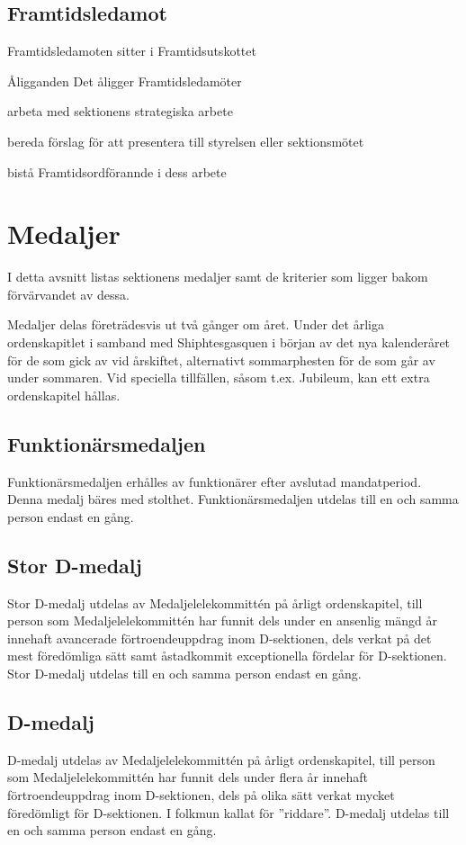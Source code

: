 \documentclass[pdfbookmarks,a4paper,11pt]{article}
\newcommand{\funktionar}[1]{%
  \subsection*{#1}\par
  \addcontentsline{toc}{subsection}{#1}}
\newlength{\itemcollength}
\newenvironment{reglemlista}{%
  \begin{list}{}{%
      \setlength{\labelwidth}{\itemcollength}%
      \setlength{\leftmargin}{\labelwidth + \labelsep}%
      \renewcommand{\makelabel}[1]{%
        \raisebox{0pt}[1ex][0pt]{%
          \makebox[\labelwidth][l]{%
            \parbox[t]{\itemcollength}{%
              \raggedright\hspace{0pt}##1}}}\hfill}%
      }}{%
  \end{list}}
\begin{document}
\funktionar{Framtidsledamot}
Framtidsledamoten sitter i Framtidsutskottet
\begin{reglemlista}
	\item[Åligganden]
	Det åligger Framtidsledamöter
	\begin{attlista}
		\item arbeta med sektionens strategiska arbete
		\item bereda förslag för att presentera till styrelsen eller sektionsmötet
		\item bistå Framtidsordförannde i dess arbete
	\end{attlista}

\end{reglemlista}

\section{Medaljer}

I detta avsnitt listas sektionens medaljer samt de kriterier som ligger bakom förvärvandet av dessa.

Medaljer delas företrädesvis ut två gånger om året. Under det årliga ordenskapitlet i samband med Shiphtesgasquen i början av det nya kalenderåret för de som gick av vid årskiftet, alternativt sommarphesten för de som går av under sommaren. Vid speciella tillfällen, såsom t.ex. Jubileum, kan ett extra ordenskapitel hållas.

\subsection{Funktionärsmedaljen}
Funktionärsmedaljen erhålles av funktionärer efter avslutad mandatperiod. Denna medalj bäres med stolthet. Funktionärsmedaljen utdelas till en och samma person endast en gång.

\subsection{Stor D-medalj}
Stor D-medalj utdelas av Medaljelelekommittén på årligt ordenskapitel, till person som Medaljelelekommittén har funnit dels under en ansenlig mängd år innehaft avancerade förtroendeuppdrag inom D-sektionen, dels verkat på det mest föredömliga sätt samt åstadkommit exceptionella fördelar för D-sektionen. Stor D-medalj utdelas till en och samma person endast en gång.

\subsection{D-medalj}
D-medalj utdelas av Medaljelelekommittén på årligt ordenskapitel, till person som Medaljelelekommittén har funnit dels under flera år innehaft förtroendeuppdrag inom D-sektionen, dels på olika sätt verkat mycket föredömligt för D-sektionen. I folkmun kallat för ''riddare''. D-medalj utdelas till en och samma person endast en gång.
\end{document}
